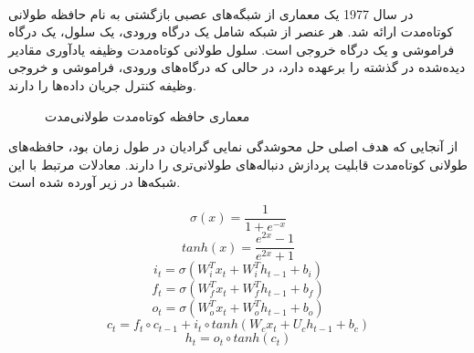 \paragraph{}
{
    در سال 1977 یک معماری از شبگه‌های عصبی بازگشتی به نام  حافظه طولانی کوتا‌ه‌مدت 
    ارائه شد. هر عنصر از شبکه شامل یک درگاه ورودی، یک سلول، یک درگاه
    فراموشی و یک درگاه خروجی است. سلول طولانی کوتا‌ه‌مدت وظیفه یادآوری 
    مقادیر دیده‌شده در گذشته را برعهده دارد، در حالی که درگاه‌های ورودی، 
    فراموشی و خروجی وظیفه کنترل جریان داده‌ها را دارند. 

    \begin{figure}[H]
        \caption{معماری حافظه کوتاه‌مدت طولانی‌مدت}
        \label{fig:lstm_1}
    \end{figure}
   
    از آنجایی که هدف اصلی حل محوشدگی نمایی گرادیان در طول زمان بود، حافظه‌های 
    طولانی کوتا‌ه‌مدت قابلیت پردازش دنباله‌های طولانی‌‌تری را دارند. معادلات مرتبط با
    این شبکه‌ها در زیر آورده شده است.

    \begin{center}
        \begin{equation} \label{eq:2}
            \sigma (x) = \frac{1}{1 + e ^{-x}}
        \end{equation}
        \begin{equation} \label{eq:3}
            tanh(x) = \frac{e^{2x} - 1}{e^{2x} + 1}
        \end{equation}
        \begin{equation} \label{eq:4}
            i_t = \sigma (W_i^T x_t + W_i^T h_{t - 1} + b_i)
        \end{equation}
        \begin{equation} \label{eq:5}
            f_t = \sigma (W_f^T x_t + W_f^T h_{t - 1} + b_f)
        \end{equation}
        \begin{equation} \label{eq:6}
            o_t = \sigma (W_o^T x_t + W_o^T h_{t - 1} + b_o)
        \end{equation}
        \begin{equation} \label{eq:7}
            c_t = f_t \circ c_{t - 1} +
                i_t \circ tanh(W_c x_t + U_c h_{t - 1} + b_c)
        \end{equation}
        \begin{equation} \label{eq:8}
            h_t = o_t \circ tanh(c_t)
        \end{equation}
    \end{center}

}
